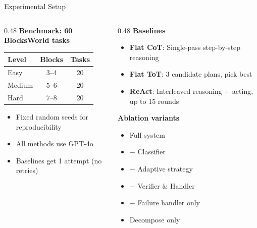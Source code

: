 \documentclass[aspectratio=169]{beamer}
\begin{document}
\begin{frame}{Experimental Setup}

\begin{columns}[T]
\begin{column}{0.48\textwidth}
\textbf{Benchmark: 60 BlocksWorld tasks}

\vspace{0.2cm}
\begin{tabular}{lcc}
\toprule
\textbf{Level} & \textbf{Blocks} & \textbf{Tasks} \\
\midrule
Easy & 3--4 & 20 \\
Medium & 5--6 & 20 \\
Hard & 7--8 & 20 \\
\bottomrule
\end{tabular}

\vspace{0.3cm}
\begin{itemize}
    \item Fixed random seeds for reproducibility
    \item All methods use GPT-4o
    \item Baselines get 1 attempt (no retries)
\end{itemize}
\end{column}

\begin{column}{0.48\textwidth}
\textbf{Baselines}
\begin{itemize}
    \item \textbf{Flat CoT}: Single-pass step-by-step reasoning
    \item \textbf{Flat ToT}: 3 candidate plans, pick best
    \item \textbf{ReAct}: Interleaved reasoning + acting, up to 15 rounds
\end{itemize}

\vspace{0.3cm}
\textbf{Ablation variants}
\begin{itemize}
    \item Full system
    \item $-$ Classifier
    \item $-$ Adaptive strategy
    \item $-$ Verifier \& Handler
    \item $-$ Failure handler only
    \item Decompose only
\end{itemize}
\end{column}
\end{columns}

\end{frame}
\end{document}
